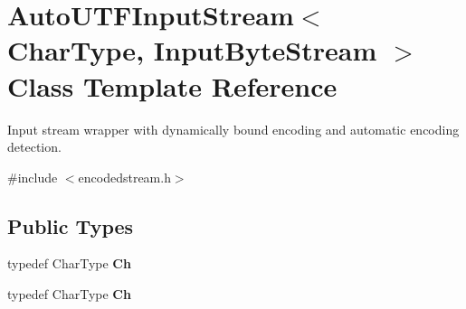 \hypertarget{class_auto_u_t_f_input_stream}{}\section{Auto\+U\+T\+F\+Input\+Stream$<$ Char\+Type, Input\+Byte\+Stream $>$ Class Template Reference}
\label{class_auto_u_t_f_input_stream}


Input stream wrapper with dynamically bound encoding and automatic encoding detection.  




{\ttfamily \#include $<$encodedstream.\+h$>$}

\subsection*{Public Types}
\begin{DoxyCompactItemize}
\item 
typedef Char\+Type {\bfseries Ch}\hypertarget{class_auto_u_t_f_input_stream_a3bb3eb46f2c20404a7ac21963cfe348f}{}\label{class_auto_u_t_f_input_stream_a3bb3eb46f2c20404a7ac21963cfe348f}

\item 
typedef Char\+Type {\bfseries Ch}\hypertarget{class_auto_u_t_f_input_stream_a3bb3eb46f2c20404a7ac21963cfe348f}{}\label{class_auto_u_t_f_input_stream_a3bb3eb46f2c20404a7ac21963cfe348f}

\end{DoxyCompactItemize}

